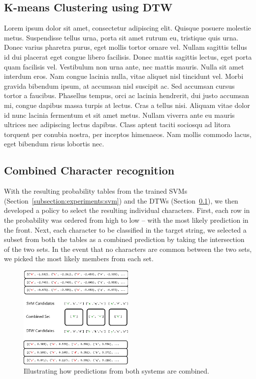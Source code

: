 \documentclass[12pt]{article}
\begin{document}
	\subsection{K-means Clustering using DTW}
	\label{subsection:experiments:dtw}
	Lorem ipsum dolor sit amet, consectetur adipiscing elit. Quisque posuere molestie metus. Suspendisse tellus urna, porta sit amet rutrum eu, tristique quis urna. Donec varius pharetra purus, eget mollis tortor ornare vel. Nullam sagittis tellus id dui placerat eget congue libero facilisis. Donec mattis sagittis lectus, eget porta quam facilisis vel. Vestibulum non urna ante, nec mattis mauris. Nulla sit amet interdum eros. Nam congue lacinia nulla, vitae aliquet nisl tincidunt vel. Morbi gravida bibendum ipsum, at accumsan nisl suscipit ac. Sed accumsan cursus tortor a faucibus. Phasellus tempus, orci ac lacinia hendrerit, dui justo accumsan mi, congue dapibus massa turpis at lectus. Cras a tellus nisi. Aliquam vitae dolor id nunc lacinia fermentum et sit amet metus. Nullam viverra ante eu mauris ultrices nec adipiscing lectus dapibus. Class aptent taciti sociosqu ad litora torquent per conubia nostra, per inceptos himenaeos. Nam mollis commodo lacus, eget bibendum risus lobortis nec.
	
	\subsection{Combined Character recognition}
	\label{subsection:experiments:combinedchar}
		
	With the resulting probability tables from the trained SVMs (Section~\ref{subsection:experiments:svm}) and the DTWs (Section~\ref{subsection:experiments:dtw}), we then developed a policy to select the resulting individual characters. First, each row in the probability was ordered from high to low -- with the most likely prediction in the front. Next, each character to be classified in the target string, we selected a subset from both the tables as a combined prediction by taking the intersection of the two sets. In the event that no characters are common between the two sets, we picked the most likely members from each set. 
	
	\begin{figure}[htbp!]
	\centering
	\includegraphics[width=0.5\textwidth]{combined_predictions.eps}
	\caption{Illustrating how predictions from both systems are combined.}
	\label{figure:combining_characters}
	\end{figure}
	
\end{document}
